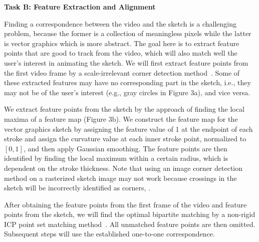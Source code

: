 \textbf{Task B: Feature Extraction and Alignment}

Finding a correspondence between the video and the sketch is a challenging problem, because the former is a collection of meaningless pixels while the latter is vector graphics which is more abstract. The goal here is to extract feature points that are good to track from the video, which will also match well the user's interest in animating the sketch.
We will first extract feature points from the first video frame by a scale-irrelevant corner detection method~\cite{grauman:2011}.
Some of these extracted features may have no corresponding part in the sketch, i.e., they may not be of the user's interest (e.g., gray circles in Figure 3a), and vice versa.


{We extract feature points from the sketch by the approach of finding the local maxima of a feature map (Figure 3b). We construct the feature map for the vector graphics sketch by assigning the feature value of 1 at the endpoint of each stroke and assign the curvature value at each inner stroke point, normalized to $[0,1]$, and then apply Gaussian smoothing. The feature points are then identified by finding the local maximum within a certain radius, which is dependent on the stroke thickness.  Note that using an image corner detection method on a rasterized sketch image may not work because crossings in the sketch will be incorrectly identified as corners, . 
} 

After obtaining the feature points from the first frame of the video and feature points from the sketch,
we will find the optimal bipartite matching by a non-rigid ICP point set matching method~\cite{Chui2003114}.
All unmatched feature points are then omitted. Subsequent steps will use the 
established one-to-one correspondence.


